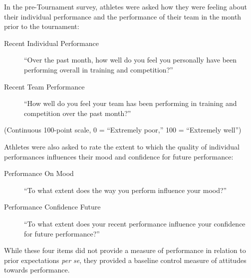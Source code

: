 In the pre-Tournament survey, athletes were asked how they were feeling about their individual performance and the performance of their team in the month prior to the tournament:

\begin{description}
\item[Recent Individual Performance] ``Over the past month, how well do you feel you personally have been performing overall in training and competition?''
\item [Recent Team Performance] ``How well do you feel your team has been performing in training and competition over the past month?''
\end{description}
(Continuous 100-point scale, 0 = ``Extremely poor,'' 100 = ``Extremely well'')

\bigskip

Athletes were also asked to rate the extent to which the quality of individual performances influences their mood and confidence for future performance:
\begin{description}
\item[Performance On Mood] ``To what extent does the way you perform influence your mood?''
\item [Performance Confidence Future] ``To what extent does your recent performance influence your confidence for future performance?''
\end{description}

While these four items did not provide a measure of performance in relation to prior expectations \textit{per se}, they provided a baseline control measure of attitudes towards performance.





